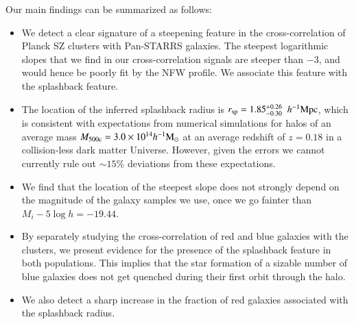\documentclass[iop, apjl, twocolappendix, numberedappendix]{emulateapj}
\def\mpch{h^{-1}{\rm Mpc}}
\def\msunh{h^{-1}{\rm M_{\odot}}}
\begin{document}
Our main findings can be summarized as follows:
\begin{itemize}
\item We detect a clear signature of a steepening feature in the
cross-correlation of Planck SZ clusters with Pan-STARRS
galaxies. The steepest logarithmic slopes that we find in our cross-correlation
signals are steeper than $-3$, and would hence be poorly fit by the
NFW profile. We associate this feature with the splashback feature.
\item The location of the inferred splashback radius is $r_{\rm
sp}=1.85_{-0.30}^{+0.26}$ $\mpch$, which is consistent with expectations
from numerical simulations for
halos of an average mass $M_{\rm 500c}=3.0\times10^{14}\msunh$ at an
average redshift of $z=0.18$ in a collision-less dark matter Universe. 
However, given the errors we cannot
currently rule out $\sim15\%$ deviations from these expectations.
\item We find that the location of the steepest slope does not
strongly depend on the magnitude of the galaxy samples we use, once
we go fainter than $M_i-5\log h=-19.44$.
\item By separately studying the cross-correlation of red and blue
galaxies with the clusters, we present evidence for the presence of
the splashback feature in both populations. This implies that the
star formation of a sizable number of blue galaxies does not get
quenched during their first orbit through the halo.
\item We also detect a sharp increase in the fraction of red
galaxies associated with the splashback radius. 
\end{itemize}
\end{document}
